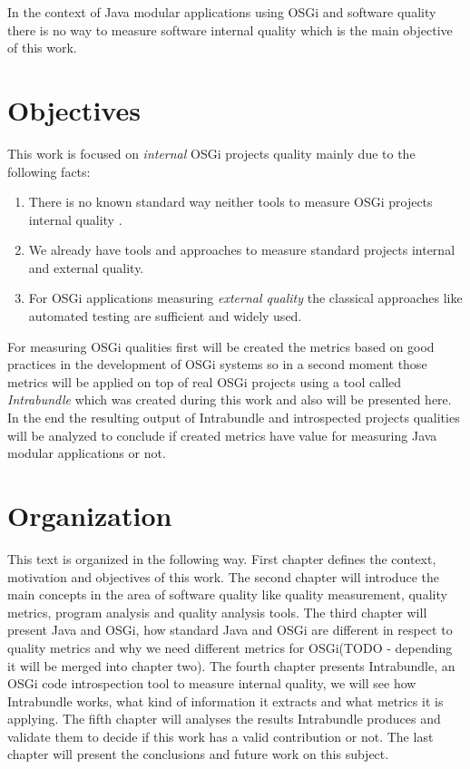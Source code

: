 In the context of Java modular applications using OSGi and software quality there is no way to measure software internal quality which is the main objective of this work.          


\section{Objectives}

This work is focused on \emph{internal} OSGi projects quality mainly due to the following facts:

\begin{enumerate}
  \item There is no known standard way neither tools to measure OSGi projects internal quality \citep{Hamza 2013}.
  \item We already have tools and approaches to measure standard projects internal and external quality.
  \item For OSGi applications measuring \emph{external quality} the classical approaches like automated testing are sufficient and widely used.
\end{enumerate}
For measuring OSGi qualities first will be created the metrics based on good practices in the development of OSGi systems so in a second moment those metrics will be applied on top of real OSGi projects using a tool called \emph{Intrabundle} which was created during this work and also will be presented here. In the end the resulting output of Intrabundle and introspected projects qualities will be analyzed to conclude if created metrics have value for measuring Java modular applications or not.  

 
\section{Organization}

This text is organized in the following way. First chapter defines the context, motivation and objectives of this work. The second chapter will introduce the main concepts in the area of software quality like quality measurement, quality metrics, program analysis and quality analysis tools. The third chapter will present Java and OSGi, how standard Java and OSGi are different in respect to quality metrics and why we need different metrics for OSGi(TODO - depending it will be merged into chapter two). The fourth chapter presents Intrabundle, an OSGi code introspection tool to measure internal quality, we will see how Intrabundle works, what kind of information it extracts and what metrics it is applying. The fifth chapter will analyses the results Intrabundle produces and validate them to decide if this work has a valid contribution or not. The last chapter will present the conclusions and future work on this subject.